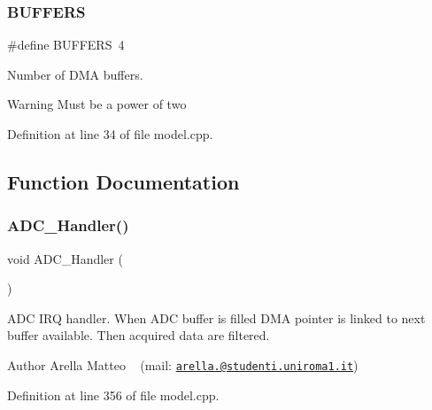 \subsubsection{\texorpdfstring{B\+U\+F\+F\+E\+RS}{BUFFERS}}
{\footnotesize\ttfamily \#define B\+U\+F\+F\+E\+RS~4}



Number of D\+MA buffers. 

\begin{DoxyWarning}{Warning}
Must be a power of two 
\end{DoxyWarning}


Definition at line 34 of file model.\+cpp.



\subsection{Function Documentation}
\mbox{\label{group___board__model__group_gaedc241164d501dcbc52cde232333c9cf}} 
\subsubsection{\texorpdfstring{A\+D\+C\+\_\+\+Handler()}{ADC\_Handler()}}
{\footnotesize\ttfamily void A\+D\+C\+\_\+\+Handler (\begin{DoxyParamCaption}{ }\end{DoxyParamCaption})}



A\+DC I\+RQ handler. When A\+DC buffer is filled D\+MA pointer is linked to next buffer available. Then acquired data are filtered. 

\begin{DoxyAuthor}{Author}
Arella Matteo ~\newline
 (mail\+: \href{mailto:arella.1646983@studenti.uniroma1.it}{\tt arella.@studenti.\+uniroma1.\+it}) 
\end{DoxyAuthor}


Definition at line 356 of file model.\+cpp.

\mbox{\label{group___board__model__group_gae0acabf32ee7f2a82b2f9149ba3d1978}} 
